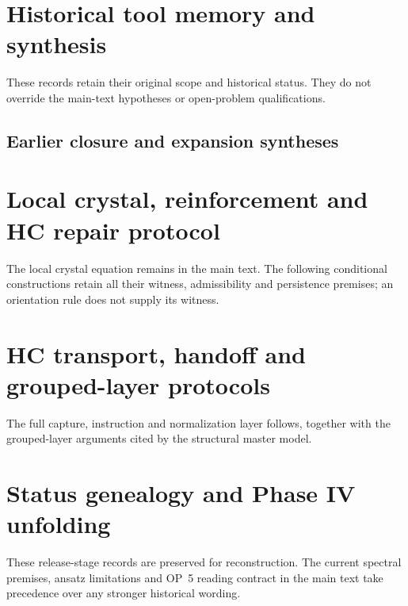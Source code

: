 \section{Historical tool memory and synthesis}
\label{app:historical-tool-memory}
These records retain their original scope and historical status. They
do not override the main-text hypotheses or open-problem qualifications.


\subsection{Earlier closure and expansion syntheses}
\label{app:legacy-synthesis}



\section{Local crystal, reinforcement and HC repair protocol}
\label{app:local-crystal-protocol}
The local crystal equation remains in the main text. The following
conditional constructions retain all their witness, admissibility and
persistence premises; an orientation rule does not supply its witness.


\section{HC transport, handoff and grouped-layer protocols}
\label{app:hc-transport-protocols}
The full capture, instruction and normalization layer follows, together
with the grouped-layer arguments cited by the structural master model.



\section{Status genealogy and Phase IV unfolding}
\label{app:status-genealogy}
These release-stage records are preserved for reconstruction. The
current spectral premises, ansatz limitations and OP~5 reading contract
in the main text take precedence over any stronger historical wording.


